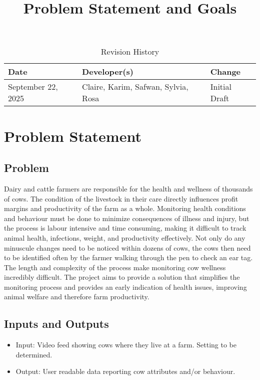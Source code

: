 \documentclass{article}
\title{Problem Statement and Goals\\\progname}
\author{\authname}
\date{}
\begin{document}
\maketitle

\begin{table}[hp]
\caption{Revision History} \label{TblRevisionHistory}
\begin{tabularx}{\textwidth}{llX}
\toprule
\textbf{Date} & \textbf{Developer(s)} & \textbf{Change}\\
\midrule
September 22, 2025 & Claire, Karim, Safwan, Sylvia, Rosa & Initial Draft\\
\bottomrule
\end{tabularx}
\end{table}

\section{Problem Statement}

\subsection{Problem}
Dairy and cattle farmers are responsible for the health and wellness of thousands of cows. The condition of the livestock in their care directly influences profit margins and productivity of the farm as a whole. Monitoring health conditions and behaviour must be done to minimize consequences of illness and injury, but the process is labour intensive and time consuming, making it difficult to track animal health, infections, weight, and productivity effectively. Not only do any minuscule changes need to be noticed within dozens of cows, the cows then need to be identified often by the farmer walking through the pen to check an ear tag. The length and complexity of the process make monitoring cow wellness incredibly difficult. The project aims to provide a solution that simplifies the monitoring process and provides an early indication of health issues, improving animal welfare and therefore farm productivity. \\ 

\subsection{Inputs and Outputs}
\begin{itemize}
    \item Input: Video feed showing cows where they live at a farm. Setting to be determined.
    \item Output: User readable data reporting cow attributes and/or behaviour. 
\end{itemize} 
\end{document}
